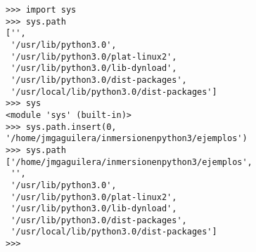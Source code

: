 \noindent\begin{minipage}{\textwidth}

\begin{lstlisting}[mathescape=True]
>>> import sys
>>> sys.path
['', 
 '/usr/lib/python3.0',  
 '/usr/lib/python3.0/plat-linux2',
 '/usr/lib/python3.0/lib-dynload',
 '/usr/lib/python3.0/dist-packages',
 '/usr/local/lib/python3.0/dist-packages']
>>> sys
<module 'sys' (built-in)>
>>> sys.path.insert(0, '/home/jmgaguilera/inmersionenpython3/ejemplos')
>>> sys.path
['/home/jmgaguilera/inmersionenpython3/ejemplos',
 '',
 '/usr/lib/python3.0',
 '/usr/lib/python3.0/plat-linux2',
 '/usr/lib/python3.0/lib-dynload',
 '/usr/lib/python3.0/dist-packages',
 '/usr/local/lib/python3.0/dist-packages']
>>> 

\end{lstlisting}
\end{minipage}

